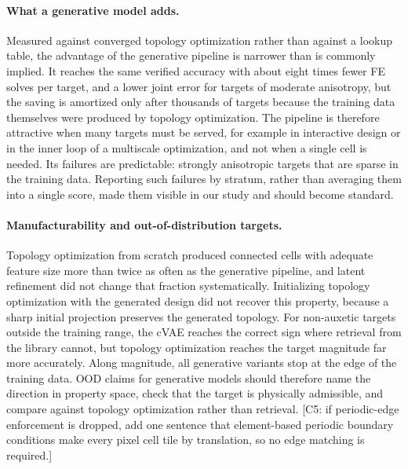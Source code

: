\paragraph{What a generative model adds.}
Measured against converged topology optimization rather than against a
lookup table, the advantage of the generative pipeline is narrower than is
commonly implied. It reaches the same verified accuracy with about eight
times fewer FE solves per target, and a lower joint error for targets of
moderate anisotropy, but the saving is amortized only after thousands of
targets because the training data themselves were produced by topology
optimization. The pipeline is therefore attractive when many targets must be
served, for example in interactive design or in the inner loop of a
multiscale optimization, and not when a single cell is needed. Its failures
are predictable: strongly anisotropic targets that are sparse in the training
data. Reporting such failures by stratum, rather than averaging them into a
single score, made them visible in our study and should become standard.

\paragraph{Manufacturability and out-of-distribution targets.}
Topology optimization from scratch produced connected cells with adequate
feature size more than twice as often as the generative pipeline, and
latent refinement did not change that fraction systematically. Initializing topology
optimization with the generated design did not recover this property,
because a sharp initial projection preserves the generated topology. For
non-auxetic targets outside the training range, the cVAE reaches the correct
sign where retrieval from the library cannot, but topology optimization
reaches the target magnitude far more accurately. Along magnitude, all
generative variants stop at the edge of the training data. OOD claims for
generative models should therefore name the direction in property space,
check that the target is physically admissible, and compare against
topology optimization rather than retrieval. [C5: if periodic-edge
enforcement is dropped, add one sentence that element-based periodic
boundary conditions make every pixel cell tile by translation, so no edge
matching is required.]
